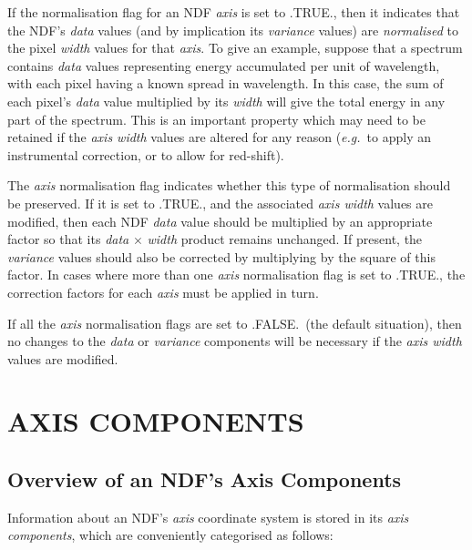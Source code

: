\documentclass[twoside,11pt]{article}
\newcommand{\xlabel}[1]{}
\newcommand{\st}[1]{{\em{#1}}}
\begin{document}
If the normalisation flag for an NDF \st{axis\/} is set to .TRUE., then it
indicates that the NDF's \st{data} values (and by implication its
\st{variance\/} values) are \st{normalised\/} to the pixel \st{width\/} values 
for that \st{axis\/}. 
To give an example, suppose that a spectrum contains \st{data\/} values
representing energy accumulated per unit of wavelength, with each pixel
having a known spread in wavelength. 
In this case, the sum of each pixel's \st{data\/} value multiplied by its
\st{width\/} will give the total energy in any part of the spectrum. 
This is an important property which may need to be retained if the \st{axis
width\/} values are altered for any reason (\st{e.g.}\ to apply an
instrumental correction, or to allow for red-shift). 

The \st{axis\/} normalisation flag indicates whether this type of
normalisation should be preserved.
If it is set to .TRUE., and the associated \st{axis width\/} values are
modified, then each NDF \st{data\/} value should be multiplied by an
appropriate factor so that its \st{data\/} $\times$ \st{width\/} product
remains unchanged.
If present, the \st{variance\/} values should also be corrected by
multiplying by the square of this factor. 
In cases where more than one \st{axis\/} normalisation flag is set to
.TRUE., the correction factors for each \st{axis\/} must be applied in
turn. 

If all the \st{axis\/} normalisation flags are set to .FALSE.\ (the default
situation), then no changes to the \st{data\/} or \st{variance\/}
components will be necessary if the \st{axis width\/} values are modified. 


\section{\xlabel{axis_components}\label{ss:axiscomponents}AXIS COMPONENTS}

\subsection{\xlabel{overview_of_an_ndfs_axis_components}Overview of an NDF's Axis Components}

Information about an NDF's \st{axis\/} coordinate system is stored in its
\st{axis components}, which are conveniently categorised as follows: 
\end{document}

